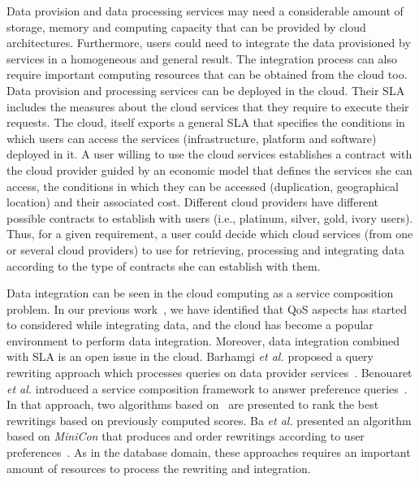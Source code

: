 \documentclass[11pt,a4paper,oneside]{report}
\begin{document}
Data provision and data processing services may need a considerable amount of storage, memory and computing capacity that can be provided by cloud architectures. Furthermore, users could need to integrate the data provisioned by services in a homogeneous and general result. The integration process can also require important computing resources that can be obtained from the cloud too. Data provision and processing services can be deployed in the cloud. Their SLA includes the measures about the cloud services that they require to execute their requests. The cloud, itself exports a general SLA that specifies the conditions in which users can access the services (infrastructure, platform and software) deployed in it. A user willing to use the cloud services establishes a contract with the cloud provider guided by an economic model that defines the services she can access, the conditions in which they can be accessed (duplication, geographical location) and their associated cost. Different cloud providers have different possible contracts to establish with users (i.e., platinum, silver, gold, ivory users). Thus, for a given requirement, a user could decide which cloud services (from one or several cloud providers) to use for retrieving, processing and integrating data according to the type of contracts she can establish with them.

Data integration can be seen in the cloud computing as a service composition problem. %
In our previous work~\cite{Carvalho2015}, we have identified that QoS aspects has started to considered while integrating data, and the cloud has become a popular environment to perform data integration. Moreover, data integration combined with SLA is an open issue in the cloud. 
%
Barhamgi \textit{et al.} proposed a query rewriting approach which processes queries on data provider services~\cite{Barhamgi2010}. %
%
Benouaret \textit{et al.} introduced a service composition framework to answer preference queries~\cite{Benouaret2011}. In that approach, two algorithms based on~\cite{Barhamgi2010} are presented to rank the best rewritings based on previously computed scores.
%
Ba \textit{et al.} presented an algorithm based on \textit{MiniCon} that produces and order rewritings according to user preferences~\cite{ba2014}. %
%
As in the database domain, these approaches requires an important amount of resources to process the rewriting and integration. 
%
\end{document}
